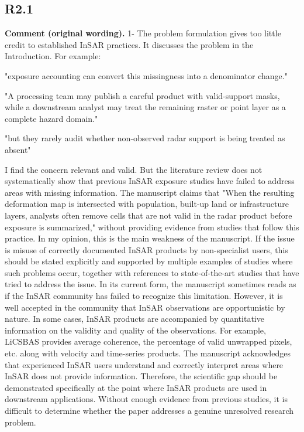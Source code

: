 \documentclass[11pt,a4paper]{article}
\begin{document}
\subsection*{R2.1}

\textbf{Comment (original wording).} 1- The problem formulation gives too little credit to established InSAR practices. It discusses the problem in the Introduction. For example:

"exposure accounting can convert this missingness into a denominator change."

"A processing team may publish a careful product with valid-support masks, while a downstream analyst may treat the remaining raster or point layer as a complete hazard domain."

"but they rarely audit whether non-observed radar support is being treated as absent"

I find the concern relevant and valid. But the literature review does not systematically show that previous InSAR exposure studies have failed to address areas with missing information. The manuscript claims that "When the resulting deformation map is intersected with population, built-up land or infrastructure layers, analysts often remove cells that are not valid in the radar product before exposure is summarized," without providing evidence from studies that follow this practice. In my opinion, this is the main weakness of the manuscript. If the issue is misuse of correctly documented InSAR products by non-specialist users, this should be stated explicitly and supported by multiple examples of studies where such problems occur, together with references to state-of-the-art studies that have tried to address the issue. In its current form, the manuscript sometimes reads as if the InSAR community has failed to recognize this limitation. However, it is well accepted in the community that InSAR observations are opportunistic by nature. In some cases, InSAR products are accompanied by quantitative information on the validity and quality of the observations. For example, LiCSBAS provides average coherence, the percentage of valid unwrapped pixels, etc. along with velocity and time-series products. The manuscript acknowledges that experienced InSAR users understand and correctly interpret areas where InSAR does not provide information. Therefore, the scientific gap should be demonstrated specifically at the point where InSAR products are used in downstream applications. Without enough evidence from previous studies, it is difficult to determine whether the paper addresses a genuine unresolved research problem.
\end{document}
